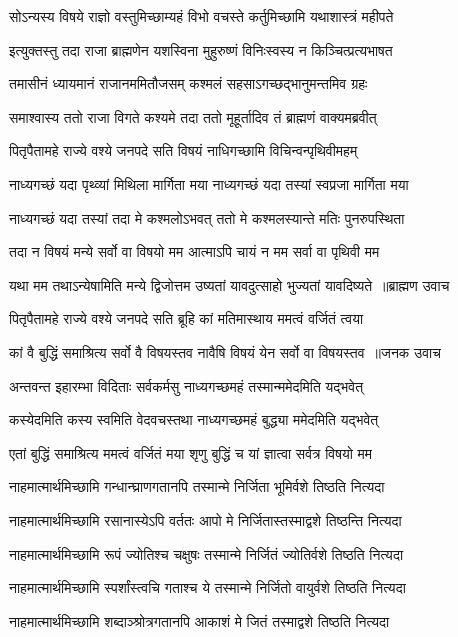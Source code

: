 \twolineshloka
{सोऽन्यस्य विषये राज्ञो वस्तुमिच्छाम्यहं विभो}
{वचस्ते कर्तुमिच्छामि यथाशास्त्रं महीपते}


\twolineshloka
{इत्युक्तस्तु तदा राजा ब्राह्मणेन यशस्विना}
{मुहुरुष्णं विनिःस्वस्य न किञ्चित्प्रत्यभाषत}


\twolineshloka
{तमासीनं ध्यायमानं राजानममितौजसम्}
{कश्मलं सहसाऽगच्छद्भानुमन्तमिव ग्रहः}


\twolineshloka
{समाश्वास्य ततो राजा विगते कश्यमे तदा}
{ततो मूहूर्तादिव तं ब्राह्मणं वाक्यमब्रवीत्}


\twolineshloka
{पितृपैतामहे राज्ये वश्ये जनपदे सति}
{विषयं नाधिगच्छामि विचिन्वन्पृथिवीमहम्}


\twolineshloka
{नाध्यगच्छं यदा पृथ्व्यां मिथिला मार्गिता मया}
{नाध्यगच्छं यदा तस्यां स्वप्रजा मार्गिता मया}


\twolineshloka
{नाध्यगच्छं यदा तस्यां तदा मे कश्मलोऽभवत्}
{ततो मे कश्मलस्यान्ते मतिः पुनरुपस्थिता}


\twolineshloka
{तदा न विषयं मन्ये सर्वो वा विषयो मम}
{आत्माऽपि चायं न मम सर्वा वा पृथिवी मम}


\threelineshloka
{यथा मम तथाऽन्येषामिति मन्ये द्विजोत्तम}
{उष्यतां यावदुत्साहो भुज्यतां यावदिष्यते ॥ब्राह्मण उवाच}
{}


\twolineshloka
{पितृपैतामहे राज्ये वश्ये जनपदे सति}
{ब्रूहि कां मतिमास्थाय ममत्वं वर्जितं त्वया}


\threelineshloka
{कां वै बुद्धिं समाश्रित्य सर्वो वै विषयस्तव}
{नावैषि विषयं येन सर्वो वा विषयस्तव ॥जनक उवाच}
{}


\twolineshloka
{अन्तवन्त इहारम्भा विदिताः सर्वकर्मसु}
{नाध्यगच्छमहं तस्मान्ममेदमिति यद्भवेत्}


\twolineshloka
{कस्येदमिति कस्य स्वमिति वेदवचस्तथा}
{नाध्यगच्छमहं बुद्ध्या ममेदमिति यद्भवेत्}


\twolineshloka
{एतां बुद्धिं समाश्रित्य ममत्वं वर्जितं मया}
{शृणु बुद्धिं च यां ज्ञात्वा सर्वत्र विषयो मम}


\twolineshloka
{नाहमात्मार्थमिच्छामि गन्धान्घ्राणगतानपि}
{तस्मान्मे निर्जिता भूमिर्वशे तिष्ठति नित्यदा}


\twolineshloka
{नाहमात्मार्थमिच्छामि रसानास्येऽपि वर्ततः}
{आपो मे निर्जितास्तस्माद्वशे तिष्ठन्ति नित्यदा}


\twolineshloka
{नाहमात्मार्थमिच्छामि रूपं ज्योतिश्च चक्षुषः}
{तस्मान्मे निर्जितं ज्योतिर्वशे तिष्ठति नित्यदा}


\twolineshloka
{नाहमात्मार्थमिच्छामि स्पर्शांस्त्वचि गताश्च ये}
{तस्मान्मे निर्जितो वायुर्वशे तिष्ठति नित्यदा}


\twolineshloka
{नाहमात्मार्थमिच्छामि शब्दाञ्श्रोत्रगतानपि}
{आकाशं मे जितं तस्माद्वशे तिष्ठति नित्यदा}


